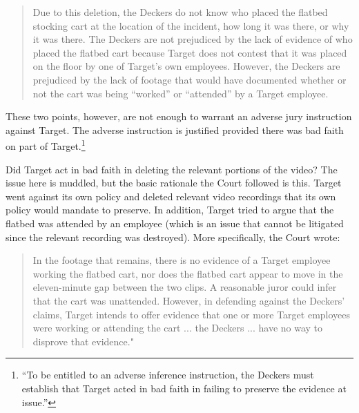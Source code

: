 \documentclass[
  10pt,
  dvipsnames,enabledeprecatedfontcommands]{scrartcl}
\begin{document}
\begin{quote}
Due to this deletion, the Deckers do not know who placed the flatbed stocking cart at the location of the incident, how long it was there, or why it was there. The Deckers are not prejudiced by the lack of evidence of who placed the flatbed cart because Target does not contest that it was placed on the floor by one of Target’s own employees. However, the Deckers are prejudiced by the lack of footage that would have documented  whether or not the cart was being “worked” or “attended” by a Target employee.
\end{quote}

\noindent  These two points, however, are not enough to warrant an
adverse jury instruction against Target. The adverse instruction is
justified provided there was bad faith on part of Target.\footnote{``To
  be entitled to an adverse inference instruction, the Deckers must
  establish that Target acted in bad faith in failing to preserve the
  evidence at issue.''}

Did Target act in bad faith in deleting the relevant portions of the
video? The issue here is muddled, but the basic rationale the Court
followed is this. Target went against its own policy and deleted
relevant video recordings that its own policy would mandate to preserve.
In addition, Target tried to argue that the flatbed was attended by an
employee (which is an issue that cannot be litigated since the relevant
recording was destroyed). More specifically, the Court wrote:

\begin{quote}
In the footage that remains, there is no evidence of a Target employee working the flatbed cart, nor does the flatbed cart appear to move in the eleven-minute gap between the two clips. A reasonable juror could infer that the cart was unattended. However, in defending against the Deckers’ claims, Target intends to offer evidence that one or more Target employees were working or attending the cart ... the Deckers ... have no way to disprove that evidence."
\end{quote}
\end{document}
